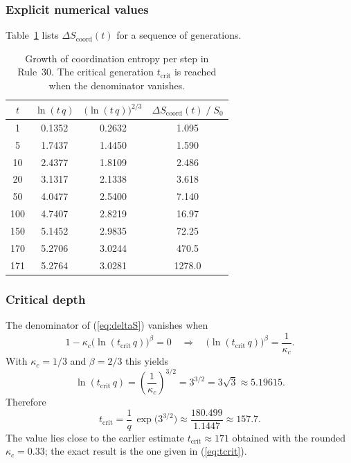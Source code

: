 \documentclass[12pt,a4paper]{article}
\begin{document}
{\subsubsection*{Explicit numerical values}
Table~\ref{tab:entropy} lists \(\Delta S_{\mathrm{coord}}(t)\) for a sequence of
generations.

\begin{table}[H]
	\centering
	\caption{Growth of coordination entropy per step in Rule~30. The critical
		generation \(t_{\mathrm{crit}}\) is reached when the denominator vanishes.}
	\label{tab:entropy}
	\small
	\begin{tabular}{c c c c}
		\toprule
		\(t\) & \(\ln(t\,q)\) & \(\bigl(\ln(t\,q)\bigr)^{2/3}\) &
		\(\Delta S_{\mathrm{coord}}(t)\;/\;S_{0}\) \\
		\midrule
		1    & 0.1352 & 0.2632 & 1.095  \\
		5    & 1.7437 & 1.4450 & 1.590  \\
		10   & 2.4377 & 1.8109 & 2.486  \\
		20   & 3.1317 & 2.1338 & 3.618  \\
		50   & 4.0477 & 2.5400 & 7.140  \\
		100  & 4.7407 & 2.8219 & 16.97  \\
		150  & 5.1452 & 2.9835 & 72.25  \\
		170  & 5.2706 & 3.0244 & 470.5  \\
		171  & 5.2764 & 3.0281 & 1278.0 \\
		\bottomrule
	\end{tabular}
\end{table}

\subsubsection*{Critical depth}
The denominator of (\ref{eq:deltaS}) vanishes when
\[
1 - \kappa_c\bigl(\ln(t_{\mathrm{crit}}\,q)\bigr)^{\beta} = 0
\quad\Longrightarrow\quad
\bigl(\ln(t_{\mathrm{crit}}\,q)\bigr)^{\beta} = \frac{1}{\kappa_c}.
\]
With \(\kappa_c = 1/3\) and \(\beta = 2/3\) this yields
\begin{equation}
	\ln(t_{\mathrm{crit}}\,q) = \left(\frac{1}{\kappa_c}\right)^{3/2}
	= 3^{3/2} = 3\sqrt{3} \approx 5.19615.
	\label{eq:crit-ln}
\end{equation}
Therefore
\begin{equation}
	\boxed{t_{\mathrm{crit}} = \frac{1}{q}\,
		\exp\!\bigl(3^{3/2}\bigr)
		\approx \frac{180.499}{1.1447} \approx 157.7}.
	\label{eq:tcrit}
\end{equation}
The value lies close to the earlier estimate \(t_{\mathrm{crit}}\approx171\)
obtained with the rounded \(\kappa_c = 0.33\); the exact result is the one
given in (\ref{eq:tcrit}).

}
\end{document}
